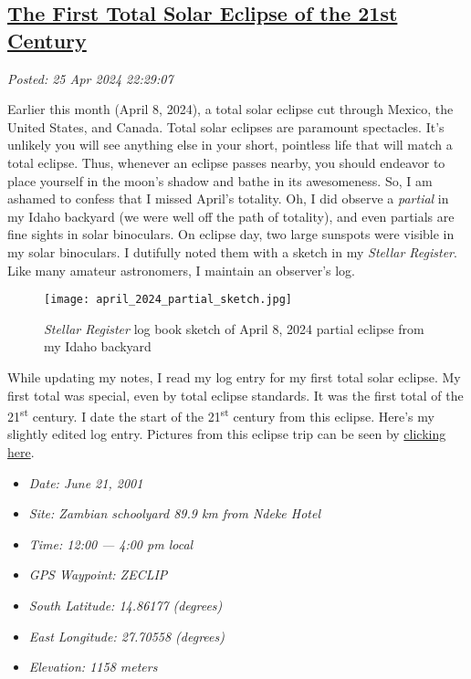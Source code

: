 %

\subsection*{\href{http://analyzethedatanotthedrivel.org/2024/04/25/the-first-total-solar-eclipse-of-the-21st-century/}{The First Total Solar Eclipse of the 21st Century}}


\noindent\emph{Posted: 25 Apr 2024 22:29:07}
\vspace{6pt}

Earlier this month (April 8, 2024), a total solar eclipse cut through
Mexico, the United States, and Canada. Total solar eclipses are
paramount spectacles. It's unlikely you will see anything else in your
short, pointless life that will match a total eclipse. Thus, whenever an
eclipse passes nearby, you should endeavor to place yourself in the
moon's shadow and bathe in its awesomeness. So, I am ashamed to confess
that I missed April's totality. Oh, I did observe a \emph{partial} in my
Idaho backyard (we were well off the path of totality), and even
partials are fine sights in solar binoculars. On eclipse day, two large
sunspots were visible in my solar binoculars. I dutifully noted them
with a sketch in my \emph{Stellar Register}. Like many amateur
astronomers, I maintain an observer's log.

\begin{figure}
\centering
\texttt{[image: april\_2024\_partial\_sketch.jpg]}
\caption{\emph{Stellar Register} log book sketch of April 8, 2024
partial eclipse from my Idaho backyard}
\end{figure}

While updating my notes, I read my log entry for my first total solar
eclipse. My first total was special, even by total eclipse standards. It
was the first total of the 21\textsuperscript{st} century. I date the
start of the 21\textsuperscript{st} century from this eclipse. Here's my
slightly edited log entry. Pictures from this eclipse trip can be seen
by
\href{https://conceptcontrol.smugmug.com/Trips/Overseas/Zambia-Eclipse-Trip-1}{clicking
here}.

\begin{itemize}
\tightlist
\item
  \emph{Date: June 21, 2001}
\item
  \emph{Site: Zambian schoolyard 89.9 km from Ndeke Hotel}
\item
  \emph{Time: 12:00} \emph{--- 4:00 pm local}
\item
  \emph{GPS Waypoint: ZECLIP}
\item
  \emph{South Latitude: 14.86177} \emph{(degrees)}
\item
  \emph{East Longitude: 27.70558 (degrees)}
\item
  \emph{Elevation: 1158 meters}
\end{itemize}

